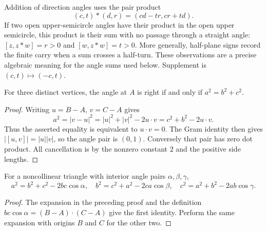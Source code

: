 Addition of direction angles uses the pair product
\[
 (c,t)*(d,r)=(cd-tr,cr+td).
\]
If two open upper-semicircle angles have their product in the open upper
semicircle, this product is their sum with no passage through a straight
angle: $[z,z*w]=r>0$ and $[w,z*w]=t>0$.  More generally, half-plane signs
record the finite carry when a sum crosses a half-turn.  These observations
are a precise algebraic meaning for the angle sums used below.  Supplement
is $(c,t)\mapsto(-c,t)$.

\begin{theorem}
\label{tri:pythagoras}
For three distinct vertices, the angle at $A$ is right if and only if
$a^2=b^2+c^2$.
\end{theorem}
\begin{proof}
Writing $u=B-A$, $v=C-A$ gives
\[
 a^2=|v-u|^2=|u|^2+|v|^2-2u\mathbin{\cdot}v
             =c^2+b^2-2u\mathbin{\cdot}v.
\]
Thus the asserted equality is equivalent to $u\mathbin{\cdot}v=0$.
The Gram identity then gives $|[u,v]|=|u||v|$, so the angle pair is
$(0,1)$.  Conversely that pair has zero dot product.  All cancellation is
by the nonzero constant $2$ and the positive side lengths.
\end{proof}

\begin{theorem}
\label{tri:cosine}
For a noncollinear triangle with interior angle pairs $\alpha,\beta,\gamma$,
\[
 a^2=b^2+c^2-2bc\cos\alpha,
\quad b^2=c^2+a^2-2ca\cos\beta,
\quad c^2=a^2+b^2-2ab\cos\gamma.
\]
\end{theorem}
\begin{proof}
The expansion in the preceding proof and the definition
$bc\cos\alpha=(B-A)\mathbin{\cdot}(C-A)$ give the first identity.
Perform the same expansion with origins $B$ and $C$ for the other two.
\end{proof}

